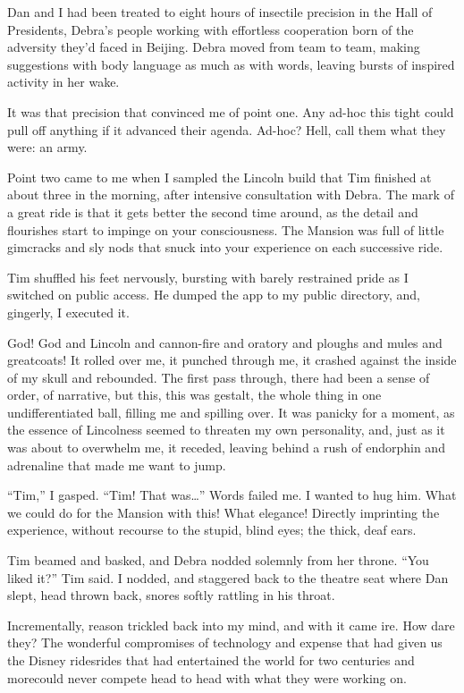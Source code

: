 Dan and I had been treated to eight hours of insectile precision in
the Hall of Presidents, Debra's people working with effortless
cooperation born of the adversity they'd faced in Beijing. Debra
moved from team to team, making suggestions with body language as
much as with words, leaving bursts of inspired activity in her
wake.

It was that precision that convinced me of point one. Any ad-hoc
this tight could pull off anything if it advanced their agenda.
Ad-hoc? Hell, call them what they were: an army.

Point two came to me when I sampled the Lincoln build that Tim
finished at about three in the morning, after intensive
consultation with Debra. The mark of a great ride is that it gets
better the second time around, as the detail and flourishes start
to impinge on your consciousness. The Mansion was full of little
gimcracks and sly nods that snuck into your experience on each
successive ride.

Tim shuffled his feet nervously, bursting with barely restrained
pride as I switched on public access. He dumped the app to my
public directory, and, gingerly, I executed it.

God! God and Lincoln and cannon-fire and oratory and ploughs and
mules and greatcoats! It rolled over me, it punched through me, it
crashed against the inside of my skull and rebounded. The first
pass through, there had been a sense of order, of narrative, but
this, this was gestalt, the whole thing in one undifferentiated
ball, filling me and spilling over. It was panicky for a moment, as
the essence of Lincolness seemed to threaten my own personality,
and, just as it was about to overwhelm me, it receded, leaving
behind a rush of endorphin and adrenaline that made me want to
jump.

“Tim,” I gasped. “Tim! That was…” Words failed me. I wanted to hug
him. What we could do for the Mansion with this! What elegance!
Directly imprinting the experience, without recourse to the stupid,
blind eyes; the thick, deaf ears.

Tim beamed and basked, and Debra nodded solemnly from her throne.
“You liked it?” Tim said. I nodded, and staggered back to the
theatre seat where Dan slept, head thrown back, snores softly
rattling in his throat.

Incrementally, reason trickled back into my mind, and with it came
ire. How dare they? The wonderful compromises of technology and
expense that had given us the Disney rides{\dash}rides that had
entertained the world for two centuries and more{\dash}could never
compete head to head with what they were working on.

